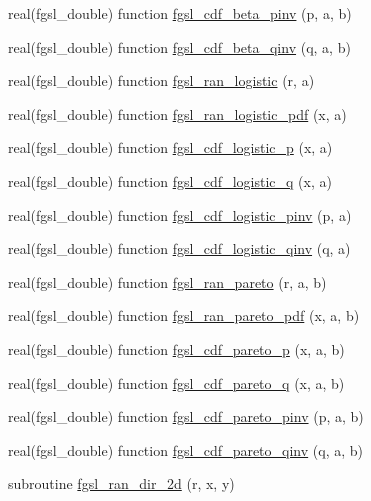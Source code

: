 \begin{DoxyCompactItemize}
\item 
real(fgsl\-\_\-double) function \hyperlink{rng_8finc_ad9f940388d86851d6a3fb67138f0cda9}{fgsl\-\_\-cdf\-\_\-beta\-\_\-pinv} (p, a, b)
\item 
real(fgsl\-\_\-double) function \hyperlink{rng_8finc_a0009c5b3be187def3e391ddf403e4a36}{fgsl\-\_\-cdf\-\_\-beta\-\_\-qinv} (q, a, b)
\item 
real(fgsl\-\_\-double) function \hyperlink{rng_8finc_afa24e40f001e4ef9cd8e3794447b9a80}{fgsl\-\_\-ran\-\_\-logistic} (r, a)
\item 
real(fgsl\-\_\-double) function \hyperlink{rng_8finc_a3d50904646cacac7540c7734e21a1590}{fgsl\-\_\-ran\-\_\-logistic\-\_\-pdf} (x, a)
\item 
real(fgsl\-\_\-double) function \hyperlink{rng_8finc_aa4001a113de807a07164d4516d756417}{fgsl\-\_\-cdf\-\_\-logistic\-\_\-p} (x, a)
\item 
real(fgsl\-\_\-double) function \hyperlink{rng_8finc_aa286aa32b87ba0c9df449bebcbfcd9f7}{fgsl\-\_\-cdf\-\_\-logistic\-\_\-q} (x, a)
\item 
real(fgsl\-\_\-double) function \hyperlink{rng_8finc_a6acf734873703cca27ee7f86519d42ee}{fgsl\-\_\-cdf\-\_\-logistic\-\_\-pinv} (p, a)
\item 
real(fgsl\-\_\-double) function \hyperlink{rng_8finc_a196052826f8d1b9e958a3732bc05e900}{fgsl\-\_\-cdf\-\_\-logistic\-\_\-qinv} (q, a)
\item 
real(fgsl\-\_\-double) function \hyperlink{rng_8finc_af630ea831bbec975f2b31e0a08aa5fb2}{fgsl\-\_\-ran\-\_\-pareto} (r, a, b)
\item 
real(fgsl\-\_\-double) function \hyperlink{rng_8finc_ae469b5eaa361c5c0e3b888fd3efc0bf3}{fgsl\-\_\-ran\-\_\-pareto\-\_\-pdf} (x, a, b)
\item 
real(fgsl\-\_\-double) function \hyperlink{rng_8finc_a4cdcd55585b860b72e948b1bd7e27461}{fgsl\-\_\-cdf\-\_\-pareto\-\_\-p} (x, a, b)
\item 
real(fgsl\-\_\-double) function \hyperlink{rng_8finc_a1199071cd8707413370f40d23d973108}{fgsl\-\_\-cdf\-\_\-pareto\-\_\-q} (x, a, b)
\item 
real(fgsl\-\_\-double) function \hyperlink{rng_8finc_afd1b3c0e697fb0f2f0935541cd05b804}{fgsl\-\_\-cdf\-\_\-pareto\-\_\-pinv} (p, a, b)
\item 
real(fgsl\-\_\-double) function \hyperlink{rng_8finc_a458ed89072db48fb5f4033bbb48fba61}{fgsl\-\_\-cdf\-\_\-pareto\-\_\-qinv} (q, a, b)
\item 
subroutine \hyperlink{rng_8finc_a80f718ba94b09ba5011351c5284c9743}{fgsl\-\_\-ran\-\_\-dir\-\_\-2d} (r, x, y)

\end{DoxyCompactItemize}
